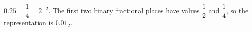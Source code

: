 $0.25=\dfrac{1}{4}=2^{-2}$. The first two binary fractional places have values $\dfrac{1}{2}$ and $\dfrac{1}{4}$, so the representation is $\boxed{0.01_2}$.
